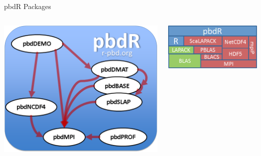 \begin{frame}
  \begin{block}{pbdR Packages}
    \begin{center}
      \begin{columns}
        \begin{column}{.52\textwidth}
      \includegraphics[scale=.4]{../common/pics/pbdR}
        \end{column}
        \hfill
        \begin{column}{.4\textwidth}
      \includegraphics[scale=.45]{../common/pics/libs}
        \end{column}
      \end{columns}
    \end{center}
  \end{block}
\end{frame}


